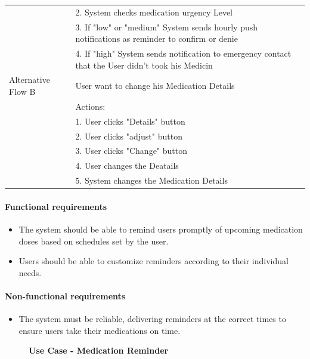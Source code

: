 \documentclass{article}
\begin{document}
\begin{table}[h!]
\begin{tabularx}{\textwidth}{|>{\raggedright\arraybackslash}p{}|X|}
                         & 2. System checks medication urgency Level \\
                         & 3. If "low" or "medium" System sends hourly push notifications as reminder 
                           to confirm or denie \\
                         & 4. If "high" System sends notification to emergency contact that the User didn't took his Medicin \\ \hline
        Alternative Flow B & User want to change his Medication Details \\
                         & Actions: \\
                         & 1. User clicks "Details" button \\
                         & 2. User clicks "adjust" button \\
                         & 3. User clicks "Change" button \\
                         & 4. User changes the Deatails \\
                         & 5. System changes the Medication Details\\ \hline
    \end{tabularx}
\end{table}

\paragraph{Functional requirements}
		\begin{itemize}
			\item  The system should be able to remind users promptly of upcoming medication doses based on schedules set by the user.
			\item  Users should be able to customize reminders according to their individual needs.
		\end{itemize}
		
	\paragraph{Non-functional requirements}
		\begin{itemize}
			\item The system must be reliable, delivering reminders at the correct times to ensure users take their medications on time.
		\end{itemize}

\clearpage

\begin{figure}[htbp]
	\textbf{Use Case - Medication Reminder}
	\centering
	\begin{subfigure}{\textwidth}
		\resizebox{\textwidth}{!}{}
	\end{subfigure}
	\begin{subfigure}{\textwidth}
	\end{subfigure}
\end{figure}
\end{document}
